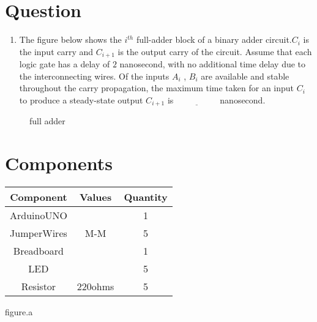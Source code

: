 \documentclass[journal, 12pt, twocolumn]{IEEEtran}
\title{\mytitle}
\author{\myauthor\hspace{1em}\\\contact\\IITH\hspace{0.5em}-\hspace{0.6em}\mymodule}
\date{22-07-2023}
\begin{document}
\theoremstyle{definition}
\newtheorem{theorem}{Theorem}[section]
\newtheorem{problem}{Problem}
\newtheorem{proposition}{Proposition}[section]
\newtheorem{lemma}{Lemma}[section]
\newtheorem{corollary}[theorem]{Corollary}
\newtheorem{example}{Example}[section]
\newtheorem{definition}{Definition}[section]
\newcommand{\BEQA}{\begin{eqnarray}}
\newcommand{\EEQA}{\end{eqnarray}}
\newcommand{\define}{\stackrel{\triangle}{=}}

\vspace{3cm}
\maketitle
\tableofcontents
\pagebreak
\section{Question}

\begin{enumerate}
    \item The figure below shows the $i^{th}$ full-adder block of a binary adder circuit.$C_{i}$  is the input carry and $C_{i+1}$ is the output carry of the circuit. Assume that each logic gate has a delay of $2$ nanosecond, with no additional time delay due to the interconnecting wires. Of the inputs $A_{i}$ , $B_{i}$ are available and stable throughout the carry propagation, the maximum time taken for an input $C_{i}$ to produce a steady-state output $C_{i+1}$ is $\underline{\hspace{2cm}}$ nanosecond.
\end{enumerate}


\begin{figure}[h]
	\centering
        
        \caption{full adder}
        \label{figs:fulladder.}
\end{figure}

\pagebreak
\section{Components}
\begin{table}[h]
  \centering
   \begin{tabular}{|c|c|c|}
   \hline
   \textbf{Component}& \textbf{Values} & \textbf{Quantity}\\
\hline
ArduinoUNO &  & 1 \\  
\hline
JumperWires& M-M & 5 \\ 
\hline
Breadboard &  & 1 \\
\hline
LED & &5 \\
\hline
Resistor & 220ohms & 5\\
\hline
   \end{tabular}
   \end{table}
\begin{center}
    figure.a
\end{center}
\end{document}
